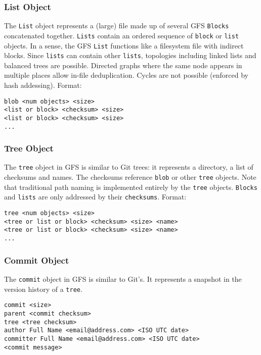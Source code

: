 \documentclass{sig-alternate}
\begin{document}
\subsubsection{List Object}

The \texttt{List} object represents a (large) file made up of several
GFS \texttt{Blocks} concatenated together. \texttt{Lists} contain
an ordered sequence of \texttt{block} or \texttt{list} objects.
In a sense, the GFS \texttt{List} functions like a filesystem file with
indirect blocks. Since \texttt{lists} can contain other \texttt{lists}, topologies including linked lists and balanced trees are possible. Directed graphs where the same node appears in multiple places allow in-file deduplication. Cycles are not possible (enforced by hash addessing).
Format:
\begin{verbatim}
blob <num objects> <size>
<list or block> <checksum> <size>
<list or block> <checksum> <size>
...
\end{verbatim}


\subsubsection{Tree Object}

The \texttt{tree} object in GFS is similar to Git trees: it represents a
directory, a list of checksums and names. The checksums reference \texttt{blob}
or other \texttt{tree} objects. Note that traditional path naming
is implemented entirely by the \texttt{tree} objects. \texttt{Blocks} and
\texttt{lists} are only addressed by their \texttt{checksums}.
Format:
\begin{verbatim}
tree <num objects> <size>
<tree or list or block> <checksum> <size> <name>
<tree or list or block> <checksum> <size> <name>
...
\end{verbatim}

\subsubsection{Commit Object}

The \texttt{commit} object in GFS is similar to Git's. It represents a
snapshot in the version history of a \texttt{tree}.

\begin{verbatim}
commit <size>
parent <commit checksum>
tree <tree checksum>
author Full Name <email@address.com> <ISO UTC date>
committer Full Name <email@address.com> <ISO UTC date>
<commit message>
\end{verbatim}
\end{document}
